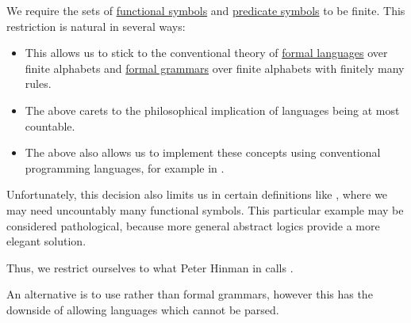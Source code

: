 \begin{remark}\label{rem:uncountable_first_order_language}
  We require the sets of \hyperref[def:first_order_language/fun]{functional symbols} and \hyperref[def:first_order_language/fun]{predicate symbols} to be finite. This restriction is natural in several ways:
  \begin{itemize}
    \item This allows us to stick to the conventional theory of \hyperref[def:formal_language/language]{formal languages} over finite alphabets and \hyperref[def:formal_grammar]{formal grammars} over finite alphabets with finitely many rules.

    \item The above carets to the philosophical implication of languages being at most countable.

    \item The above also allows us to implement these concepts using conventional programming languages, for example in \cite{notebook:code}.
  \end{itemize}

  Unfortunately, this decision also limits us in certain definitions like , where we may need uncountably many functional symbols. This particular example may be considered pathological, because more general abstract logics provide a more elegant solution.

  Thus, we restrict ourselves to what Peter Hinman in  calls .

  An alternative is to use  rather than formal grammars, however this has the downside of allowing languages which cannot be parsed.
\end{remark}

